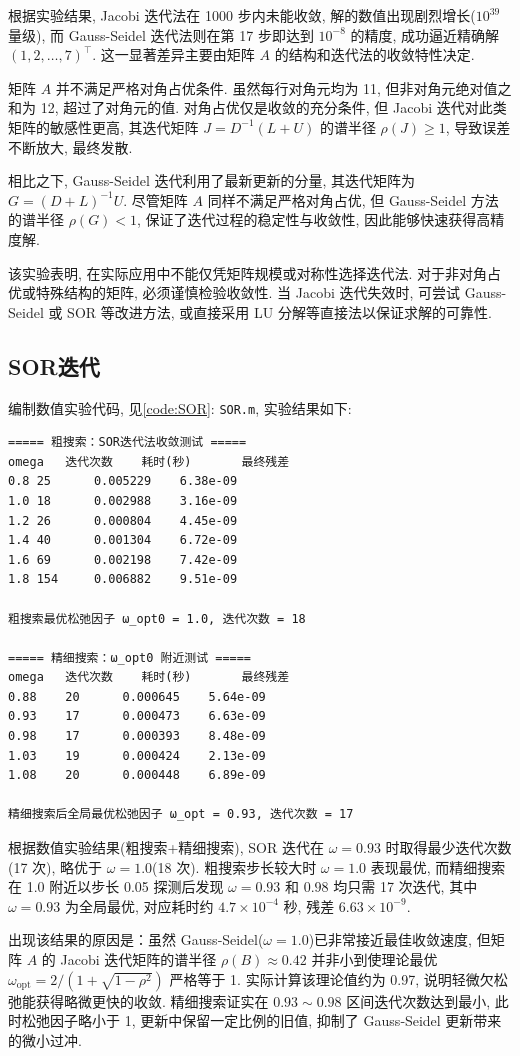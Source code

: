 \documentclass[12pt,a4paper]{ctexart}
\begin{document}
根据实验结果, Jacobi 迭代法在 1000 步内未能收敛, 解的数值出现剧烈增长($10^{39}$ 量级), 而 Gauss-Seidel 迭代法则在第 17 步即达到 $10^{-8}$ 的精度, 成功逼近精确解 $(1,2,\dots,7)^\top$. 这一显著差异主要由矩阵 $A$ 的结构和迭代法的收敛特性决定. 

矩阵 $A$ 并不满足严格对角占优条件. 虽然每行对角元均为 11, 但非对角元绝对值之和为 12, 超过了对角元的值. 对角占优仅是收敛的充分条件, 但 Jacobi 迭代对此类矩阵的敏感性更高, 其迭代矩阵 $J = D^{-1}(L+U)$ 的谱半径 $\rho(J) \ge 1$, 导致误差不断放大, 最终发散. 

相比之下, Gauss-Seidel 迭代利用了最新更新的分量, 其迭代矩阵为 $G = (D+L)^{-1}U$. 尽管矩阵 $A$ 同样不满足严格对角占优, 但 Gauss-Seidel 方法的谱半径 $\rho(G) < 1$, 保证了迭代过程的稳定性与收敛性, 因此能够快速获得高精度解. 

该实验表明, 在实际应用中不能仅凭矩阵规模或对称性选择迭代法. 对于非对角占优或特殊结构的矩阵, 必须谨慎检验收敛性. 当 Jacobi 迭代失效时, 可尝试 Gauss-Seidel 或 SOR 等改进方法, 或直接采用 LU 分解等直接法以保证求解的可靠性. 
\subsection{SOR迭代}
编制数值实验代码, 见\ref{code:SOR}: \texttt{SOR.m}, 实验结果如下:
\begin{lstlisting}
===== 粗搜索：SOR迭代法收敛测试 =====
omega	迭代次数	耗时(秒)		最终残差
0.8	25		0.005229	6.38e-09
1.0	18		0.002988	3.16e-09
1.2	26		0.000804	4.45e-09
1.4	40		0.001304	6.72e-09
1.6	69		0.002198	7.42e-09
1.8	154		0.006882	9.51e-09

粗搜索最优松弛因子 ω_opt0 = 1.0, 迭代次数 = 18

===== 精细搜索：ω_opt0 附近测试 =====
omega	迭代次数	耗时(秒)		最终残差
0.88	20		0.000645	5.64e-09
0.93	17		0.000473	6.63e-09
0.98	17		0.000393	8.48e-09
1.03	19		0.000424	2.13e-09
1.08	20		0.000448	6.89e-09

精细搜索后全局最优松弛因子 ω_opt = 0.93, 迭代次数 = 17
\end{lstlisting}

根据数值实验结果(粗搜索+精细搜索), SOR 迭代在 $\omega=0.93$ 时取得最少迭代次数(17 次), 略优于 $\omega=1.0$(18 次). 粗搜索步长较大时 $\omega=1.0$ 表现最优, 而精细搜索在 1.0 附近以步长 0.05 探测后发现 $\omega=0.93$ 和 $0.98$ 均只需 17 次迭代, 其中 $\omega=0.93$ 为全局最优, 对应耗时约 $4.7\times10^{-4}$ 秒, 残差 $6.63\times10^{-9}$.   

出现该结果的原因是：虽然 Gauss‑Seidel($\omega=1.0$)已非常接近最佳收敛速度, 但矩阵 $A$ 的 Jacobi 迭代矩阵的谱半径 $\rho(B)\approx0.42$ 并非小到使理论最优 $\omega_{\text{opt}}=2/(1+\sqrt{1-\rho^2})$ 严格等于 1. 实际计算该理论值约为 0.97, 说明轻微欠松弛能获得略微更快的收敛. 精细搜索证实在 $0.93\sim0.98$ 区间迭代次数达到最小, 此时松弛因子略小于 1, 更新中保留一定比例的旧值, 抑制了 Gauss‑Seidel 更新带来的微小过冲.   
\end{document}
